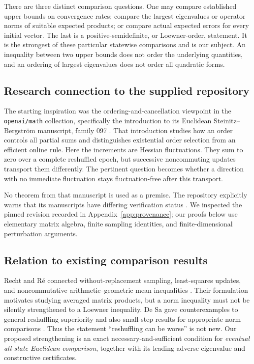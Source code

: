 \documentclass[11pt,letterpaper]{article}
\numberwithin{equation}{section}
\theoremstyle{definition}
\begin{document}
There are three distinct comparison questions. One may compare established upper bounds on convergence rates; compare the largest eigenvalues or operator norms of suitable expected products; or compare actual expected errors for every initial vector. The last is a positive-semidefinite, or Loewner-order, statement. It is the strongest of these particular statewise comparisons and is our subject. An inequality between two upper bounds does not order the underlying quantities, and an ordering of largest eigenvalues does not order all quadratic forms.

\subsection{Research connection to the supplied repository}

The starting inspiration was the ordering-and-cancellation viewpoint in the \texttt{openai/math} collection, specifically the introduction to its Euclidean Steinitz--Bergstr\"om manuscript, family 097 \cite{OpenAISteinitz}. That introduction studies how an order controls all partial sums and distinguishes existential order selection from an efficient online rule. Here the increments are Hessian fluctuations. They sum to zero over a complete reshuffled epoch, but successive noncommuting updates transport them differently. The pertinent question becomes whether a direction with no immediate fluctuation stays fluctuation-free after this transport.

No theorem from that manuscript is used as a premise. The repository explicitly warns that its manuscripts have differing verification status \cite{OpenAIRepository}. We inspected the pinned revision recorded in Appendix~\ref{app:provenance}; our proofs below use elementary matrix algebra, finite sampling identities, and finite-dimensional perturbation arguments.

\subsection{Relation to existing comparison results}

Recht and R\'e connected without-replacement sampling, least-squares updates, and noncommutative arithmetic--geometric mean inequalities \cite{RechtRe2012}. Their formulation motivates studying averaged matrix products, but a norm inequality must not be silently strengthened to a Loewner inequality. De Sa gave counterexamples to general reshuffling superiority and also small-step results for appropriate norm comparisons \cite{DeSa2020}. Thus the statement ``reshuffling can be worse'' is not new. Our proposed strengthening is an exact necessary-and-sufficient condition for \emph{eventual all-state Euclidean comparison}, together with its leading adverse eigenvalue and constructive certificates.
\end{document}
